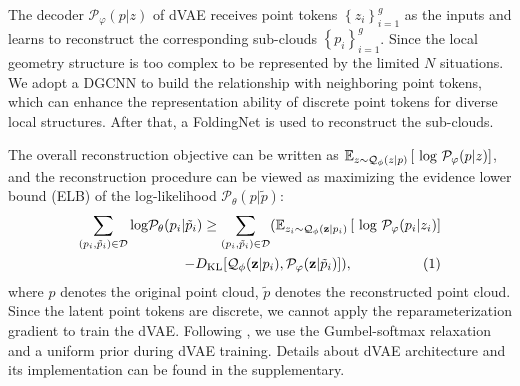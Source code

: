   The decoder  $\mathcal{P}_{\varphi }(p|z)$ of dVAE receives point tokens $\left \{  z_{i} \right \}_{i=1}^{g}$  as the inputs and learns to reconstruct the corresponding sub-clouds $\left \{  p_{i} \right \}_{i=1}^{g}$. Since the local geometry structure is too complex to be represented by the limited $N$ situations. We adopt a DGCNN\cite{wang2019dynamic} to build the relationship with neighboring point tokens, which can enhance the representation ability of discrete point tokens for diverse local structures. After that, a FoldingNet\cite{foldingnet} is used to reconstruct the sub-clouds.
	
The overall reconstruction objective can be written as $\mathbb{E}_{z\sim \mathcal{Q}_{\phi}(z|p)} \left [ \textup{ log  } \mathcal{P}_{\varphi  }(p|z) \right ]$, and the reconstruction procedure can be viewed as maximizing the evidence lower bound (ELB) of the log-likelihood $\mathcal{P}_{\theta }(p|\tilde{p})$\cite{ramesh2021zero}:
\small	
\begin{equation} \label{eq:elb}
\begin{split}	
	\sum_{(p_{i},\tilde{p}_{i})\in\mathcal{D}}\textup{log} \mathcal{P}_{\theta }(p_{i}|\tilde{p}_{i}) \geq   \sum_{(p_{i},\tilde{p}_{i})\in\mathcal{D}}(\mathbb{E}_{z_{i}\sim \mathcal{Q}_{\phi}(\mathbf{z}|p_{i})} \left [ \textup{ log  } \mathcal{P}_{\varphi  }(p_{i}|z_{i}) \right ]   \\
	- D_{\textup{KL}} [\mathcal{Q}_{\phi}(\mathbf{z}|p_{i}),\mathcal{P}_{\varphi }(\mathbf{z}|\tilde{p}_{i})  ] ),   \qquad \qquad \quad    (1)\nonumber%
\end{split}%
\end{equation}%
\normalsize
where $p$ denotes the original point cloud, $\tilde{p}$ denotes the reconstructed point cloud. Since the latent point tokens are discrete, we cannot apply the reparameterization gradient to train the dVAE. Following \cite{ramesh2021zero}, we use the Gumbel-softmax relaxation\cite{jang2016categorical} and a uniform prior during dVAE training. Details about dVAE architecture and its implementation can be found in the supplementary.


